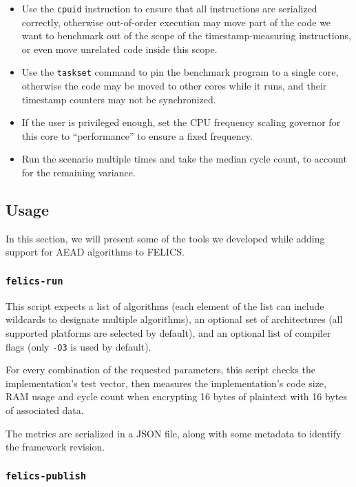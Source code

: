 \documentclass{article}
\begin{document}
\begin{itemize}
\item Use the \texttt{cpuid} instruction to ensure that all
  instructions are serialized correctly, otherwise out-of-order
  execution may move part of the code we want to benchmark out of the
  scope of the timestamp-measuring instructions, or even move
  unrelated code inside this scope.

\item Use the \texttt{taskset} command to pin the benchmark program to
  a single core, otherwise the code may be moved to other cores while
  it runs, and their timestamp counters may not be synchronized.

\item If the user is privileged enough, set the CPU frequency scaling
  governor for this core to ``performance'' to ensure a fixed
  frequency.

\item Run the scenario multiple times and take the median cycle count,
  to account for the remaining variance.
\end{itemize}

\subsection{Usage}
\label{sec:felics-ae/usage}

In this section, we will present some of the tools we developed while
adding support for AEAD algorithms to FELICS.

\subsubsection{\texttt{felics-run}}

This script expects a list of algorithms (each element of the list can
include wildcards to designate multiple algorithms), an optional set
of architectures (all supported platforms are selected by default),
and an optional list of compiler flags (only \texttt{-O3} is used by
default).

For every combination of the requested parameters, this script checks
the implementation's test vector, then measures the implementation's
code size, RAM usage and cycle count when encrypting 16 bytes of
plaintext with 16 bytes of associated data.

The metrics are serialized in a JSON file, along with some metadata to
identify the framework revision.

\subsubsection{\texttt{felics-publish}}
\end{document}
